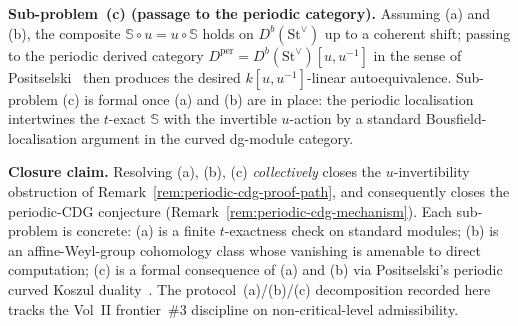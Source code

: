 \begin{remark}
\medskip
\noindent\textbf{Sub-problem~(c) (passage to the periodic category).}
Assuming (a) and (b), the composite $\mathbb{S}\circ u = u\circ\mathbb{S}$
holds on $D^b(\mathrm{St}^\vee)$ up to a coherent shift; passing to
the periodic derived category
$D^{\mathrm{per}} = D^b(\mathrm{St}^\vee)[u,u^{-1}]$ in the sense of
Positselski~\cite{Positselski11,Positselski18} then produces the
desired $k[u,u^{-1}]$-linear autoequivalence. Sub-problem (c) is
formal once (a) and (b) are in place: the periodic localisation
intertwines the $t$-exact $\mathbb{S}$ with the invertible $u$-action
by a standard Bousfield-localisation argument in the curved dg-module
category.

\medskip
\noindent\textbf{Closure claim.} Resolving (a), (b), (c)
\emph{collectively} closes the $u$-invertibility obstruction of
Remark~\textup{\ref{rem:periodic-cdg-proof-path}}, and consequently
closes the periodic-CDG conjecture (Remark~\ref{rem:periodic-cdg-mechanism}). Each sub-problem is concrete:
(a) is a finite $t$-exactness check on standard modules;
(b) is an affine-Weyl-group cohomology class whose vanishing is
amenable to direct computation; (c) is a formal consequence of
(a) and (b) via Positselski's periodic curved Koszul
duality~\cite{Positselski11,Positselski18}. The protocol~(a)/(b)/(c) decomposition recorded here tracks the
Vol~II frontier~\#3 discipline on non-critical-level admissibility.
\end{remark}

